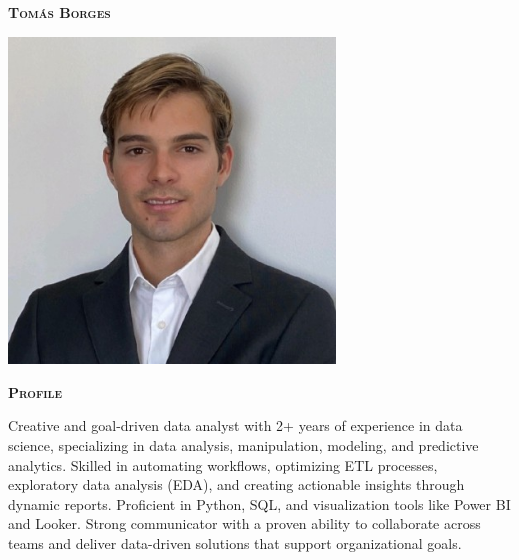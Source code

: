 \documentclass[11pt, a4paper]{article}
\newcommand{\headleft}[1]{\vspace*{3ex}\textsc{\textbf{#1}}\par%
    \vspace*{-1.5ex}\hrulefill\par\vspace*{0.7ex}}
\begin{document}
\setlength{\topskip}{0pt}
\setlength{\parindent}{0pt}
\setlength{\parskip}{0pt}
\setlength{\fboxsep}{0pt}
\pagestyle{empty}
\raggedbottom

\begin{minipage}[t]{0.33\textwidth} %
\colorbox{cvblue}{\begin{minipage}[t][5mm][t]{\textwidth}\null\hfill\null\end{minipage}}

\vspace{-.2ex} %
\colorbox{cvblue!90}{\color{white}  %
\textwidth\relax%
\begin{minipage}[t][293mm][t]{0.82\textwidth}
\raggedright
\vspace*{2.5ex}

\Large \textbf{\textsc{Tomás Borges}} \normalsize 

\null\hfill\includegraphics[width=0.65\textwidth]{pfp.jpeg}\hfill\null

\vspace*{0.5ex} %

\headleft{Profile}
Creative and goal-driven data analyst with 2+ years of experience in data science, specializing in data analysis, manipulation, modeling, and predictive analytics. Skilled in automating workflows, optimizing ETL processes, exploratory data analysis (EDA), and creating actionable insights through dynamic reports. Proficient in Python, SQL, and visualization tools like Power BI and Looker. Strong communicator with a proven ability to collaborate across teams and deliver data-driven solutions that support organizational goals.


\end{minipage}}
\end{minipage}
\end{document}
